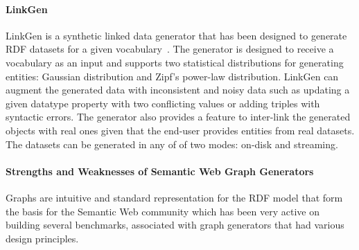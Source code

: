\paragraph{LinkGen} LinkGen is a synthetic linked data generator that has been designed to generate RDF datasets for a given vocabulary~\cite{10.1007/978-3-319-46547-0_12}. The generator is designed to receive a vocabulary as an input  and supports two statistical distributions for generating entities: Gaussian distribution and Zipf's power-law distribution. LinkGen can augment the generated data with inconsistent and noisy  data such as updating a given datatype property with two conflicting values or  adding triples with syntactic errors. \iffalse, adding wrong statements by assigning them with invalid domain and creating instances with no type information.\fi The generator also provides a feature to inter-link the generated objects with real ones given that the end-user provides entities from real datasets. The datasets can be generated in any of of two modes: on-disk and streaming.


\paragraph{Strengths and Weaknesses of Semantic Web Graph Generators}  Graphs are intuitive and standard representation for the RDF model that form the basis for the Semantic Web community which has been very active on building several benchmarks, associated with graph generators that had various design principles. 

